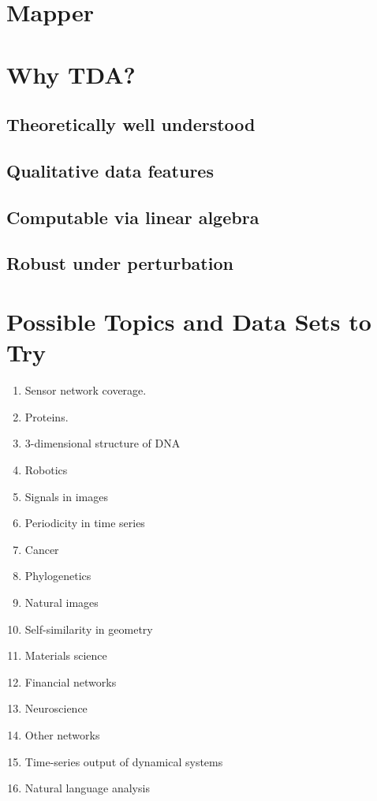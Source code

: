 \documentclass[10pt,a4paper]{article}
\begin{document}
\section{Mapper}

\section{Why TDA?}
\subsection{Theoretically well understood}
\subsection{Qualitative data features}
\subsection{Computable via linear algebra}
\subsection{Robust under perturbation}

\section{Possible Topics and Data Sets to Try}
\begin{enumerate}
	\item Sensor network coverage.
	\item Proteins.
	\item 3-dimensional structure of DNA
	\item Robotics
	\item Signals in images
	\item Periodicity in time series
	\item Cancer
	\item Phylogenetics
	\item Natural images
	\item Self-similarity in geometry
	\item Materials science
	\item Financial networks
	\item Neuroscience
	\item Other networks
	\item Time-series output of dynamical systems
	\item Natural language analysis
\end{enumerate}

\newpage


\end{document}

